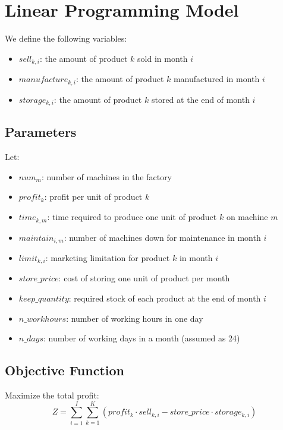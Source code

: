 \documentclass{article}
\begin{document}
\section*{Linear Programming Model}

We define the following variables:

\begin{itemize}
    \item \( sell_{k, i} \): the amount of product \( k \) sold in month \( i \)
    \item \( manufacture_{k, i} \): the amount of product \( k \) manufactured in month \( i \)
    \item \( storage_{k, i} \): the amount of product \( k \) stored at the end of month \( i \)
\end{itemize}

\subsection*{Parameters}

Let:
\begin{itemize}
    \item \( num_{m} \): number of machines in the factory
    \item \( profit_{k} \): profit per unit of product \( k \)
    \item \( time_{k, m} \): time required to produce one unit of product \( k \) on machine \( m \)
    \item \( maintain_{i, m} \): number of machines down for maintenance in month \( i \)
    \item \( limit_{k, i} \): marketing limitation for product \( k \) in month \( i \)
    \item \( store\_price \): cost of storing one unit of product per month
    \item \( keep\_quantity \): required stock of each product at the end of month \( i \)
    \item \( n\_workhours \): number of working hours in one day
    \item \( n\_days \): number of working days in a month (assumed as 24)
\end{itemize}

\subsection*{Objective Function}

Maximize the total profit:
\[
Z = \sum_{i=1}^{I} \sum_{k=1}^{K} \left( profit_k \cdot sell_{k, i} - store\_price \cdot storage_{k, i} \right)
\]
\end{document}
